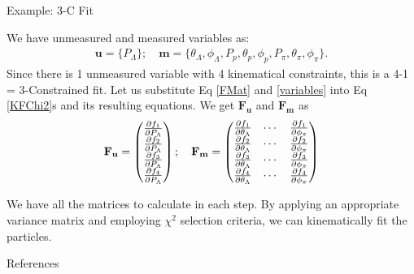 \documentclass[
	xcolor=dvipsnames,
	10pt, 
	]{beamer}
\begin{document}
\begin{frame}{Example: 3-C Fit}
	\begin{block}{}
		We have unmeasured and measured variables as:
		\begin{align}
			\mathbf{u} = \{P_\Lambda\};\quad \mathbf{m}=\{\theta_\Lambda,\phi_\Lambda,P_p,\theta_p,\phi_p,P_\pi,\theta_\pi,\phi_\pi\}.\label{variables}
		\end{align}		
		Since there is 1 unmeasured variable with 4 kinematical constraints, this is a 4-1 = 3-Constrained fit. Let us substitute Eq \eqref{FMat} and \eqref{variables} into Eq \eqref{KFChi2}s and its resulting equations. We get $\mathbf{F_u}$ and $\mathbf{F_m}$ as
		\begin{align}
			\mathbf{F_u}=
			\begin{pmatrix}
				\frac{\partial f_1}{\partial P_\Lambda}\\
				\frac{\partial f_2}{\partial P_\Lambda}\\
				\frac{\partial f_3}{\partial P_\Lambda}\\
				\frac{\partial f_4}{\partial P_\Lambda}
			\end{pmatrix};\quad \mathbf{F_m}=\begin{pmatrix}
			\frac{\partial f_1}{\partial \theta_\Lambda} &\cdots&\frac{\partial f_1}{\partial \phi_\pi} \\
			\frac{\partial f_2}{\partial \theta_\Lambda} &\cdots&\frac{\partial f_2}{\partial \phi_\pi}\\
			\frac{\partial f_3}{\partial \theta_\Lambda} &\cdots&\frac{\partial f_3}{\partial \phi_\pi}\\
			\frac{\partial f_4}{\partial \theta_\Lambda} &\cdots&\frac{\partial f_4}{\partial \phi_\pi}
			\end{pmatrix}
		\end{align}
		\begin{adjustwidth}{13mm}{}{
		We have all the matrices to calculate in each step. By applying an appropriate variance matrix and employing $\chi^2$ selection criteria, we can kinematically fit the particles.}
		\end{adjustwidth}
	\end{block}
\end{frame}
\begin{frame}{References}
	 	\printbibliography
\end{frame}
\end{document}
